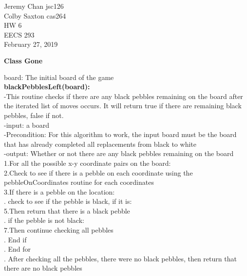 \documentclass[12pt]{article}
\begin{document}
\begin{flushleft}
Jeremy Chan jsc126\\
Colby Saxton cas264\\
HW 6\\
EECS 293\\
February 27, 2019\newline

\textbf{Class Gone}\\
\end{flushleft}

\begin{paragraph}
\indent board: The initial board of the game\\

\indent \textbf{blackPebblesLeft(board):}\\
\indent	-This routine checks if there are any black pebbles remaining on the board after the iterated list of moves occurs. It will return true if there are remaining black pebbles, false if not.\\
\indent	-input: a board\\
\indent	-Precondition: For this algorithm to work, the input board must be the board that has already completed all replacements from black to white \\
\indent	-output: Whether or not there are any black pebbles remaining on the board\\
\linebreak
\indent\indent 1.For all the possible x-y coordinate pairs on the board:\\
\indent\indent\indent 2.Check to see if there is a pebble on each coordinate using the pebbleOnCoordinates routine for each coordinates\\
\indent\indent\indent\indent   3.If there is a pebble on the location:\\
\indent\indent\indent\indent{}. check to see if the pebble is black, if it is:\\
\indent\indent\indent\indent\indent\indent 5.Then return that there is a black pebble\\
\indent\indent\indent\indent{}. if the pebble is not black:\\
\indent\indent\indent\indent\indent\indent 7.Then continue checking all pebbles\\
\indent\indent\indent{}. End if\\
\indent{}. End for\\
\indent{}. After checking all the pebbles, there were no black pebbles, then return that there are no black pebbles\\
\linebreak


\end{paragraph}
\end{document}
